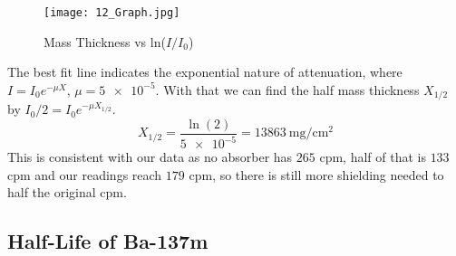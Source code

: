 \documentclass[11pt]{article}
\begin{document}
	\begin{figure}[htbp]
		\centering
		\texttt{[image: 12\_Graph.jpg]}
		\caption{Mass Thickness vs ln($I/I_0$)}
		\label{fig:12_Graph}
	\end{figure}
	
	The best fit line indicates the exponential nature of attenuation, where $I=I_0 e^{-\mu X}$, $\mu = \num{5e-5}$. With that we can find the half mass thickness $X_{1/2}$ by $I_0 /2 = I_0 e^{-\mu X_{1/2}}$.
	\[
		X_{1/2} = \frac{\ln(2)}{\num{5e-5}} = \qty{13863}{\milli\gram\per\centi\meter\squared}
	\]
	This is consistent with our data as no absorber has $265$ cpm, half of that is $133$ cpm and our readings reach $179$ cpm, so there is still more shielding needed to half the original cpm.
	
	
\clearpage

	\subsection{Half-Life of Ba-137m}
	
\end{document}
